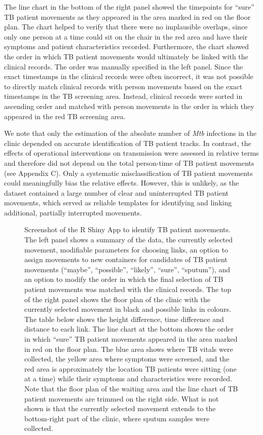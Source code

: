 \documentclass[11pt]{article}
\begin{document}
The line chart in the bottom of the right panel showed the timepoints for ``sure'' TB patient movements as they appeared in the area marked in red on the floor plan. The chart helped to verify that there were no implausible overlaps, since only one person at a time could sit on the chair in the red area and have their symptoms and patient characteristics recorded. Furthermore, the chart showed the order in which TB patient movements would ultimately be linked with the clinical records. The order was manually specified in the left panel. Since the exact timestamps in the clinical records were often incorrect, it was not possible to directly match clinical records with person movements based on the exact timestamps in the TB screening area. Instead, clinical records were sorted in ascending order and matched with person movements in the order in which they appeared in the red TB screening area.

We note that only the estimation of the absolute number of \emph{Mtb} infections in the clinic depended on accurate identification of TB patient tracks. In contrast, the effects of operational interventions on transmission were assessed in relative terms and therefore did not depend on the total person-time of TB patient movements (see Appendix C). Only a systematic misclassification of TB patient movements could meaningfully bias the relative effects. However, this is unlikely, as the dataset contained a large number of clear and uninterrupted TB patient movements, which served as reliable templates for identifying and linking additional, partially interrupted movements.

\begin{figure}[H]
\caption{Screenshot of the R Shiny App to identify TB patient movements. The left panel shows a summary of the data, the currently selected movement, modifiable parameters for choosing links, an option to assign movements to new containers for candidates of TB patient movements (``maybe'', ``possible'', ``likely'', ``sure'', ``sputum''), and an option to modify the order in which the final selection of TB patient movements was matched with the clinical records. The top of the right panel shows the floor plan of the clinic with the currently selected movement in black and possible links in colours. The table below shows the height difference, time difference and distance to each link. The line chart at the bottom shows the order in which ``sure'' TB patient movements appeared in the area marked in red on the floor plan. The blue area shows where TB vitals were collected, the yellow area where symptoms were screened, and the red area is approximately the location TB patients were sitting (one at a time) while their symptoms and characteristics were recorded. Note that the floor plan of the waiting area and the line chart of TB patient movements are trimmed on the right side. What is not shown is that the currently selected movement extends to the bottom-right part of the clinic, where sputum samples were collected.}
\label{fig:S1}
\end{figure}
\end{document}
